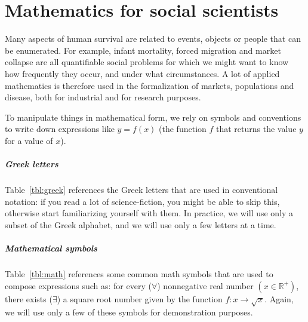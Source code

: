 %
%
\chapter{Mathematics for social scientists}%
  \label{ch:math}%




Many aspects of human survival are related to events, objects or people that can be enumerated. For example, infant mortality, forced migration and market collapse are all quantifiable social problems for which we might want to know how frequently they occur, and under what circumstances. A lot of applied mathematics is therefore used in the formalization of markets, populations and disease, both for industrial and for research purposes.

To manipulate things in mathematical form, we rely on symbols and conventions to write down expressions like $y = f(x)$ (the function $f$ that returns the value $y$ for a value of $x$).

%
\paragraph{Greek letters}%
%
Table~\ref{tbl:greek} references the Greek letters that are used in conventional notation: if you read a lot of science-fiction, you might be able to skip this, otherwise start familiarizing yourself with them. In practice, we will use only a subset of the Greek alphabet, and we will use only a few letters at a time.




%
\paragraph{Mathematical symbols}%
%
Table~\ref{tbl:math} references some common math symbols that are used to compose expressions such as: for every ($\forall$) nonnegative real number $(x \in \mathbb{R}^{+})$, there exists ($\exists$) a square root number given by the function $f: x \rightarrow \sqrt{x}$. Again, we will use only a few of these symbols for demonstration purposes.

